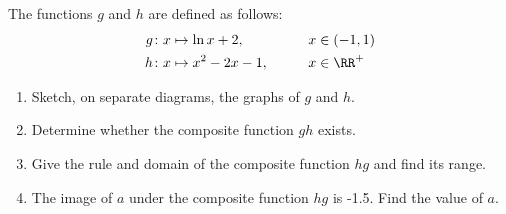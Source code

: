 \begin{problem}
    The functions $g$ and $h$ are defined as follows:
    \begin{alignat*}{2}
        g & \colon x \mapsto \ln{x+2}, &&\qquad x \in (-1, 1)\\
        h & \colon x \mapsto x^2 - 2x - 1, &&\qquad x \in \RR^+
    \end{alignat*}

    \begin{enumerate}
        \item Sketch, on separate diagrams, the graphs of $g$ and $h$.
        \item Determine whether the composite function $gh$ exists.
        \item Give the rule and domain of the composite function $hg$ and find its range.
        \item The image of $a$ under the composite function $hg$ is -1.5. Find the value of $a$.
    \end{enumerate}
\end{problem}
